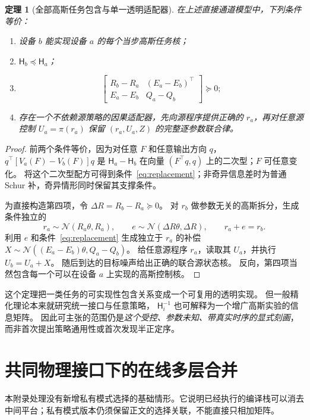 \documentclass[UTF8,fontset=fandol,11pt,a4paper]{ctexart}
\newcommand{\N}{\mathcal N}
\newtheorem{theorem}{定理}[section]
\theoremstyle{definition}
\theoremstyle{remark}
\numberwithin{equation}{section}
\begin{document}
\begin{theorem}[全部高斯任务包含与单一透明适配器]
\label{thm:universal}
在上述直接通道模型中，下列条件等价：
\begin{enumerate}
\item 设备 $b$ 能实现设备 $a$ 的每个当步高斯任务核；
\item $\mathsf H_b\preceq\mathsf H_a$；
\item
\begin{equation}
 \begin{bmatrix}
 R_b-R_a&(E_a-E_b)^\top\\
 E_a-E_b&Q_a-Q_b
 \end{bmatrix}\succeq0;\label{eq:replacement}
\end{equation}
\item 存在一个不依赖源策略的因果适配器，先向源程序提供正确的 $r_a$，再对任意源控制 $U_a=\pi(r_a)$ 保留 $(r_a,U_a,Z)$ 的完整逐参数联合律。
\end{enumerate}
\end{theorem}

\begin{proof}
前两个条件等价，因为对任意 $F$ 和任意输出方向 $q$，
$q^\top[V_a(F)-V_b(F)]q$ 是 $\mathsf H_a-\mathsf H_b$ 在向量 $(F^\top q,q)$ 上的二次型；$F$ 可任意变化。
将这个二次型配方可得到条件~\eqref{eq:replacement}；非奇异信息差时为普通 Schur 补，奇异情形同时保留其支撑条件。

为直接构造第四项，令 $\Delta R=R_b-R_a\succeq0$。
对 $r_b$ 做参数无关的高斯拆分，生成条件独立的
\[
 r_a\sim\N(R_a\theta,R_a),\qquad e\sim\N(\Delta R\theta,\Delta R),
 \qquad r_a+e=r_b.
\]
利用 $e$ 和条件~\eqref{eq:replacement} 生成独立于 $r_a$ 的补偿
$X\sim\N((E_a-E_b)\theta,Q_a-Q_b)$。
给任意源程序 $r_a$，读取其 $U_a$，并执行 $U_b=U_a+X$。
随后到达的目标噪声给出正确的联合源状态核。
反向，第四项当然包含每一个可以在设备 $a$ 上实现的高斯控制核。
\end{proof}

这个定理把一类任务的可实现性包含关系变成一个可复用的透明实现。
但一般精化理论本来就研究统一接口与任意策略\cite{hsa}，
$\mathsf H_i^{-1}$ 也可解释为一个增广高斯实验的信息矩阵。
因此可主张的范围仍是\emph{这个受控、参数未知、带真实时序的显式刻画}，而非首次提出策略通用性或首次发现半正定序。

\section{共同物理接口下的在线多层合并}
\label{sec:fusion}

本附录处理没有新增私有模式选择的基础情形。它说明已经执行的编译栈可以消去中间平台；私有模式版本仍须保留正文的选择关联，不能直接只相加矩阵。
\end{document}
